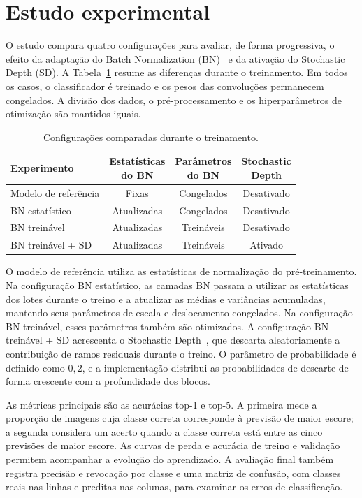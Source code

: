 \section{Estudo experimental}
\label{sec:estudo-experimental}

O estudo compara quatro configurações para avaliar, de forma progressiva,
o efeito da adaptação do Batch Normalization
(BN)~\cite{ioffe2015batchnorm} e da ativação do Stochastic Depth (SD). A
Tabela~\ref{tab:configuracoes-experimentais} resume as diferenças durante
o treinamento. Em todos os casos, o classificador é treinado e os pesos
das convoluções permanecem congelados. A divisão dos dados, o
pré-processamento e os hiperparâmetros de otimização são mantidos iguais.

\begin{table}[ht]
  \centering
  \caption{Configurações comparadas durante o treinamento.}
  \label{tab:configuracoes-experimentais}
  \begin{tabular}{lccc}
    \hline
    Experimento & \shortstack{Estatísticas\\do BN} &
      \shortstack{Parâmetros\\do BN} & \shortstack{Stochastic\\Depth} \\
    \hline
    Modelo de referência & Fixas & Congelados & Desativado \\
    BN estatístico & Atualizadas & Congelados & Desativado \\
    BN treinável & Atualizadas & Treináveis & Desativado \\
    BN treinável + SD & Atualizadas & Treináveis & Ativado \\
    \hline
  \end{tabular}
\end{table}

O modelo de referência utiliza as estatísticas de normalização do
pré-treinamento. Na configuração BN estatístico, as camadas BN passam a utilizar as
estatísticas dos lotes durante o treino e a atualizar as médias e variâncias
acumuladas, mantendo seus parâmetros de escala e deslocamento congelados.
Na configuração BN treinável, esses parâmetros também são otimizados.
A configuração BN treinável + SD acrescenta o Stochastic
Depth~\cite{huang2016stochasticdepth}, que descarta aleatoriamente a
contribuição de ramos residuais durante o treino. O parâmetro de
probabilidade é definido como $0{,}2$, e a implementação distribui as
probabilidades de descarte de forma crescente com a profundidade dos blocos.

As métricas principais são as acurácias top-1 e top-5. A primeira mede a
proporção de imagens cuja classe correta corresponde à previsão de maior
escore; a segunda considera um acerto quando a classe correta está entre
as cinco previsões de maior escore. As curvas de perda e acurácia de treino
e validação permitem acompanhar a evolução do aprendizado. A avaliação
final também registra precisão e revocação por classe e uma matriz de
confusão, com classes reais nas linhas e preditas nas colunas, para examinar
os erros de classificação.
